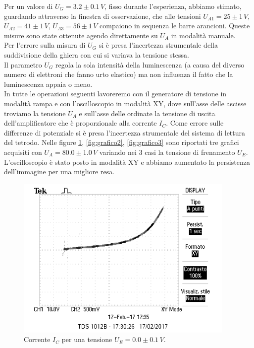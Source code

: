 \documentclass[10pt,a4paper]{article}
\begin{document}
Per un valore di $U_G = 3.2 \pm 0.1 \, V $, fisso durante l'esperienza, abbiamo stimato, guardando attraverso la finestra di osservazione, che alle tensioni $U_{A1} = 25 \pm 1 \, V$, $U_{A2} = 41 \pm 1 \, V$, $U_{A3} = 56 \pm 1 \, V$ compaiono in sequenza le barre arancioni. Queste misure sono state ottenute agendo direttamente su $U_A$ in modalità manuale.\\
Per l'errore sulla misura di $U_G$ si è presa l'incertezza strumentale della suddivisione della ghiera con cui si variava la tensione stessa.\\ 
Il parametro $U_G$ regola la sola intensità della luminescenza (a causa del diverso numero di elettroni che fanno urto elastico) ma non influenza il fatto che la luminescenza appaia o meno.\\
In tutte le operazioni seguenti lavoreremo con il generatore di tensione in modalità rampa e con l'oscilloscopio in modalità XY, dove sull'asse delle ascisse troviamo la tensione $U_A$ e sull'asse delle ordinate la tensione di uscita dell'amplificatore che è proporzionale alla corrente $I_C$. Come errore sulle differenze di potenziale si è presa l'incertezza strumentale del sistema di lettura del tetrodo.
Nelle figure \ref{fig:grafico1}, \ref{fig:grafico2}, \ref{fig:grafico3} sono riportati tre grafici acquisiti con $U_A = 80.0\pm1.0 \, V$ variando nei 3 casi la tensione di frenamento $U_E$. L'oscilloscopio è stato posto in modalità XY e abbiamo aumentato la persistenza dell'immagine per una migliore resa.\\


\begin{figure}[!htb]
  \centering
  \includegraphics[scale=1.0]{uezero.png}
\caption{Corrente $I_C$ per una tensione $U_E = 0.0\pm0.1 \, V$.\label{fig:grafico1}}

\end{figure}
\end{document}

